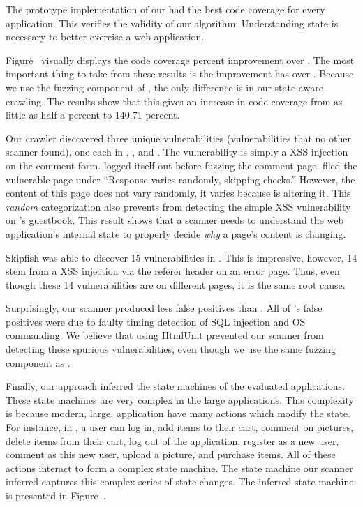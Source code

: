 The prototype implementation of our \crawler{} had the best code coverage for
every application. This verifies the validity of our algorithm: Understanding
state is necessary to better exercise a web application.

Figure~ visually displays the code coverage percent
improvement over \wget{}. The most important thing to take from these results
is the improvement \crawler{} has over \waf{}. Because we use the fuzzing
component of \waf{}, the only difference is in our state-aware crawling. The
results show that this gives \crawler{} an increase in code coverage from as
little as half a percent to 140.71 percent.

Our crawler discovered three unique vulnerabilities (vulnerabilities that no
other scanner found), one each in \phpbbtwo{},
\scarf{}, and \wackopicko{}. The \scarf{} vulnerability is simply a XSS injection
on the comment form. \waf{} logged itself out before fuzzing the comment page.
\skipfish{} filed the vulnerable page under ``Response varies
randomly, skipping checks.'' However, the content of this page does not vary
randomly, it varies because \skipfish{} is altering it. This \emph{random} categorization also prevents
\skipfish{} from detecting the simple XSS vulnerability on \wackopicko{}'s
guestbook. This result shows that a scanner needs to understand the web application's
internal state to properly decide \emph{why} a page's content is changing. 

Skipfish was able to discover 15 vulnerabilities in \vanillaforums{}. This is
impressive, however, 14 stem from a XSS injection via the referer header on an
error page. Thus, even though these 14 vulnerabilities are on different pages,
it is the same root cause. 

Surprisingly, our scanner produced less false positives than \waf{}. All of
\waf{}'s false positives were due to faulty timing detection of SQL injection
and OS commanding. We believe that using HtmlUnit prevented our scanner from
detecting these spurious vulnerabilities, even though we use the same fuzzing
component as \waf{}.

Finally, our approach inferred the state machines of the evaluated
applications. These state machines are very complex in the large applications.
This complexity is because modern, large, application have many actions which modify the
state. For instance, in \wackopicko{}, a user can log in, add items to their
cart, comment on pictures, delete items from their cart, log out of the
application, register as a new user, comment as this new user, upload a
picture, and purchase items. All of these actions interact to form a complex
state machine. The state machine our scanner inferred captures this complex
series of state changes. The inferred \wackopicko{} state machine is presented
in Figure~.

